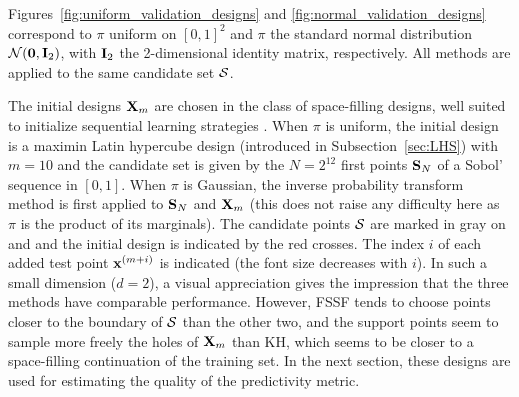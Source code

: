 Figures~\ref{fig:uniform_validation_designs} and \ref{fig:normal_validation_designs} correspond to $\pi$ uniform on $[0,1]^2$ and $\pi$ the standard normal distribution $\SN(\0b,\Ib_2)$, with $\mathbf{I}_2$ the 2-dimensional identity matrix, respectively. 
All methods are applied to the same candidate set $\mathcal{S}$. 

The initial designs ${\bf X}_m$ are chosen in the class of space-filling designs, well suited to initialize sequential learning strategies \citep{sanwil03}. 
When $\pi$ is uniform, the initial design is a maximin Latin hypercube design (introduced in Subsection~\ref{sec:LHS}) with $m=10$ and the candidate set is given by the $N=2^{12}$ first points $\mathbf{S}_N$ of a Sobol' sequence in $[0,1]$. 
When $\pi$ is Gaussian, the inverse probability transform method is first applied to $\mathbf{S}_N$ and ${\bf X}_m$ (this does not raise any difficulty here as $\pi$ is the product of its marginals). 
The candidate points $\mathcal{S}$ are marked in gray on  and  and the initial design is indicated by the red crosses. 
The index $i$ of each added test point ${\bf x}^{(m+i)}$ is indicated (the font size decreases with $i$). 
In such a small dimension ($d=2$), a visual appreciation gives the impression that the three methods have comparable performance. 
However, FSSF tends to choose points closer to the boundary of $\mathcal{S}$ than the other two, and the support points seem to sample more freely the holes of ${\bf X}_m$ than KH, which seems to be closer to a space-filling continuation of the training set. 
In the next section, these designs are used for estimating the quality of the predictivity metric.


